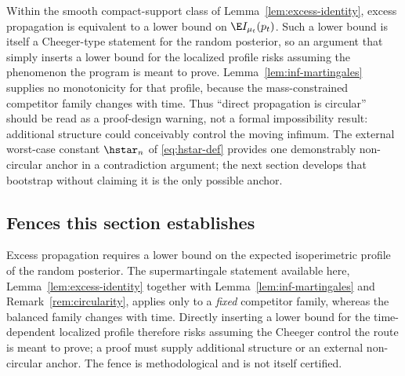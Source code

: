 \documentclass[../../main.tex]{subfiles}
\begin{document}
\begin{remark}
\label{rem:circularity}
Within the smooth compact-support class of Lemma~\ref{lem:excess-identity}, excess propagation
is equivalent to a lower bound on $\E I_{\mu_t}(p_t)$. Such a lower bound is itself a
Cheeger-type statement for the random
posterior, so an argument that simply inserts a lower bound for the localized profile risks
assuming the phenomenon the program is meant to prove. Lemma~\ref{lem:inf-martingales} supplies
no monotonicity for that profile, because the mass-constrained competitor family changes with
time. Thus ``direct propagation is circular'' should be read as a proof-design warning, not a
formal impossibility result: additional structure could conceivably control the moving
infimum. The external worst-case constant $\hstar_n$ of \eqref{eq:hstar-def} provides one
demonstrably non-circular anchor in a contradiction argument; the next section develops that
bootstrap without claiming it is the only possible anchor.
\end{remark}
\subsection{Fences this section establishes}
\label{subsec:excess-fences}

\begin{obstruction}
\label{obs:circularity}
Excess propagation requires a lower bound on the expected isoperimetric profile of the random
posterior. The supermartingale statement available here, Lemma~\ref{lem:excess-identity} together
with Lemma~\ref{lem:inf-martingales} and Remark~\ref{rem:circularity}, applies only to a
\emph{fixed} competitor family, whereas the balanced family changes with time. Directly inserting
a lower bound for the time-dependent localized profile therefore risks assuming the Cheeger
control the route is meant to prove; a proof must supply additional structure or an external
non-circular anchor. The fence is methodological and is not itself certified.
\end{obstruction}
\end{document}
